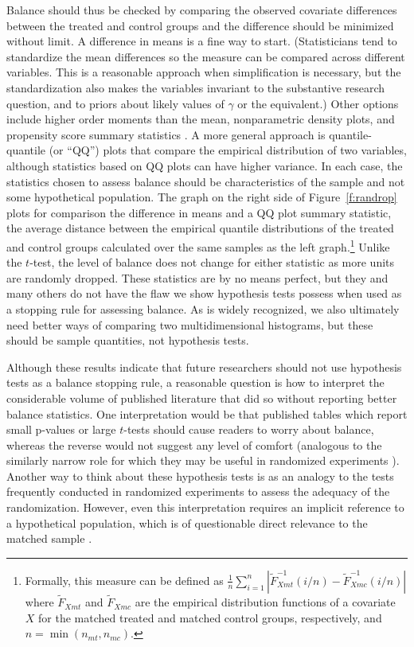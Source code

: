 \documentclass[11pt,titlepage]{article}
\begin{document}
Balance should thus be checked by comparing the observed covariate
differences between the treated and control groups and the difference
should be minimized without limit.  A difference in means is a fine
way to start.  (Statisticians tend to standardize the mean differences
so the measure can be compared across different variables.  This is a
reasonable approach when simplification is necessary, but the
standardization also makes the variables invariant to the substantive
research question, and to priors about likely values of $\gamma$ or
the equivalent.) Other options include higher order moments than the
mean, nonparametric density plots, and propensity score summary
statistics \citep{AusMam06, Hansen04, Rubin01}. A more general
approach is quantile-quantile (or ``QQ'') plots that compare the
empirical distribution of two variables, although statistics based on
QQ plots can have higher variance.  In each case, the statistics
chosen to assess balance should be characteristics of the sample and
not some hypothetical population.  The graph on the right side of
Figure~\ref{f:randrop} plots for comparison the difference in means
and a QQ plot summary statistic, the average distance between the
empirical quantile distributions of the treated and control groups
calculated over the same samples as the left graph.\footnote{Formally,
  this measure can be defined as $\frac{1}{n} \sum_{i=1}^n
  |\widetilde{F}_{Xmt}^{-1}(i/n) - \widetilde{F}^{-1}_{Xmc}(i/n)|$
  where $\widetilde{F}_{Xmt}$ and $\widetilde{F}_{Xmc}$ are the
  empirical distribution functions of a covariate $X$ for the matched
  treated and matched control groups, respectively, and
  $n=\min(n_{mt},n_{mc})$.}  Unlike the $t$-test, the level of balance
does not change for either statistic as more units are randomly
dropped.  These statistics are by no means perfect, but they and many
others do not have the flaw we show hypothesis tests possess when used
as a stopping rule for assessing balance.  As is widely recognized, we
also ultimately need better ways of comparing two multidimensional
histograms, but these should be sample quantities, not hypothesis
tests.

Although these results indicate that future researchers should not use
hypothesis tests as a balance stopping rule, a reasonable question is
how to interpret the considerable volume of published literature that
did so without reporting better balance statistics.  One
interpretation would be that published tables which report small
p-values or large $t$-tests should cause readers to worry about
balance, whereas the reverse would not suggest any level of comfort
(analogous to the similarly narrow role for which they may be useful
in randomized experiments \citealt{Senn94}).  Another way to think
about these hypothesis tests is as an analogy to the tests frequently
conducted in randomized experiments to assess the adequacy of the
randomization.  However, even this interpretation requires an implicit
reference to a hypothetical population, which is of questionable
direct relevance to the matched sample \citep{Cochran65}.

\clearpage


\end{document}
